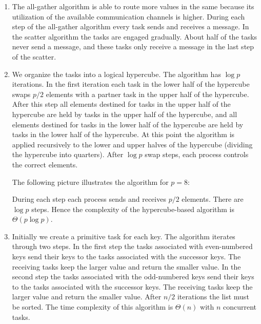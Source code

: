 \begin{enumerate}
\item The all-gather algorithm is able to route more values in the same
      because its utilization of the available communication channels is
      higher. During each step of the all-gather algorithm every task
      sends and receives a message. In the scatter algorithm the tasks
      are engaged gradually. About half of the tasks never send a message,
      and these tasks only receive a message in the last step of the
      scatter.

\item We organize the tasks into a logical
      hypercube. The algorithm has $\log p$ iterations. In the first iteration
      each task in the lower half of the hypercube swaps $p/2$ elements with
      a partner task in the upper half of the hypercube.
      After this step all elements destined for tasks in the upper half of the
      hypercube are held by tasks in the upper half of the hypercube, and
      all elements destined for tasks in the lower half of the
      hypercube are held by tasks in the lower half of the hypercube.
      At this point the algorithm is applied recursively to the lower
      and upper halves of the hypercube (dividing the hypercube into quarters).
      After $\log p$ swap steps, each process controls the correct elements.

      The following picture illustrates the algorithm for $p = 8$:

      \begin{center}
      \end{center}
    
      During each step each process sends and receives $p/2$ elements.
      There are $\log p$ steps. Hence the complexity of the hypercube-based
      algorithm is $\Theta(p\log p)$.

\item Initially we create a primitive task for each key.
      The algorithm iterates through two steps.
      In the first step the tasks associated with even-numbered keys
      send their keys to the tasks associated with the successor keys.
      The receiving tasks keep the larger value and return the smaller value.
      In the second step the tasks associated with the odd-numbered keys
      send their keys to the tasks associated with the successor keys.
      The receiving tasks keep the larger value and return the smaller value.
      After $n/2$ iterations the list must be sorted.
      The time complexity of this algorithm is $\Theta(n)$ with $n$ 
      concurrent tasks.


\end{enumerate}
